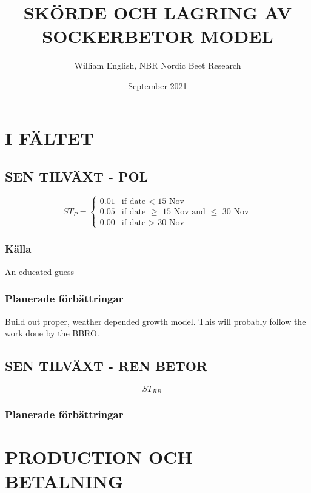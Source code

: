 \documentclass[fleqn]{article}
\title{SKÖRDE OCH LAGRING AV SOCKERBETOR MODEL}
\author{William English, NBR Nordic Beet Research}
\date{September 2021}
\begin{document}


\maketitle

\pagebreak

\section{I FÄLTET}

\subsection{SEN TILVÄXT - POL}

\begin{equation}
ST_P = 
\begin{cases}
0.01 & \text{if date < 15 Nov}\\
0.05 & \text{if date $\geq$ 15 Nov and $\leq$ 30 Nov}\\
0.00 & \text{if date > 30 Nov}
\end{cases}
\end{equation}

\subsubsection{Källa}
An educated guess

\subsubsection{Planerade förbättringar}
Build out proper, weather depended growth model. This will probably follow the work done by the BBRO.

\subsection{SEN TILVÄXT - REN BETOR}

\begin{equation}
ST_{RB} = 
\end{equation}

\subsubsection{Planerade förbättringar}

\pagebreak
\section{PRODUCTION OCH BETALNING}
\end{document}
